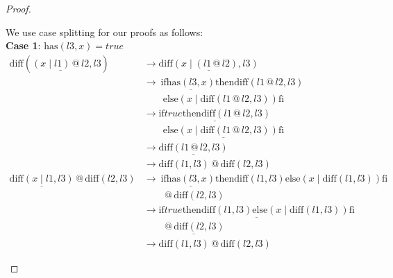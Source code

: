 \documentclass[12pt, a4paper]{article}
\newcommand{\rel}[1]{\mathrel{#1}}
\newcommand{\rmx}[1]{\mathrm{#1}}
\newcommand{\larrow}{\longrightarrow}
\newcommand{\under}{\underline}
\begin{document}
\begin{proof}
\begin{description}
We use case splitting for our proofs as follows: \\
\textbf{Case 1}: $\rmx{has}(l3, x) = true$
\begin{align*}
\rmx{diff}(\under{(x \rel{|} l1) \rel{@} l2}, l3)
	&\larrow \under{\rmx{diff}(x \rel{|} (l1 \rel{@} l2), l3)} \tag{by } \\
	&\larrow\ \rel{\rmx{if}} \under{\rmx{has}(l3, x)} \rel{\rmx{then}} \rmx{diff}(l1 \rel{@} l2, l3) \\
	&\quad \quad \rel{\rmx{else}} (x \rel{|} \rmx{diff}(l1 \rel{@} l2, l3)) \rel{\rmx{fi}} \tag{by diff2} \\
	&\larrow \under{\rel{\rmx{if}} true \rel{\rmx{then}} \rmx{diff}(l1 \rel{@} l2, l3)} \\
	&\quad \quad \under{\rel{\rmx{else}} (x \rel{|} \rmx{diff}(l1 \rel{@} l2, l3)) \rel{\rmx{fi}}} \tag{by case splitting} \\
	&\larrow \under{\rmx{diff}(l1 \rel{@} l2, l3)} \tag{by if1} \\
	&\larrow \rmx{diff}(l1, l3) \rel{@} \rmx{diff}(l2, l3) \tag{by IH} \\
\under{\rmx{diff}(x \rel{|} l1, l3)} \rel{@} \rmx{diff}(l2, l3)
	&\larrow\ \rel{\rmx{if}} \under{\rmx{has}(l3, x)} \rel{\rmx{then}} \rmx{diff}(l1, l3) \rel{\rmx{else}} (x \rel{|} \rmx{diff}(l1, l3)) \rel{\rmx{fi}} \\
	&\quad \quad \rel{@} \rmx{diff}(l2, l3) \tag{by diff2} \\
	&\larrow \under{\rel{\rmx{if}} true \rel{\rmx{then}} \rmx{diff}(l1, l3) \rel{\rmx{else}} (x \rel{|} \rmx{diff}(l1, l3)) \rel{\rmx{fi}}} \\
	&\quad \quad \under{\rel{@} \rmx{diff}(l2, l3)} \tag{by case splitting} \\
	&\larrow \rmx{diff}(l1, l3) \rel{@} \rmx{diff}(l2, l3) \tag{by if1}
\end{align*}


\end{description}
\end{proof}
\end{document}
